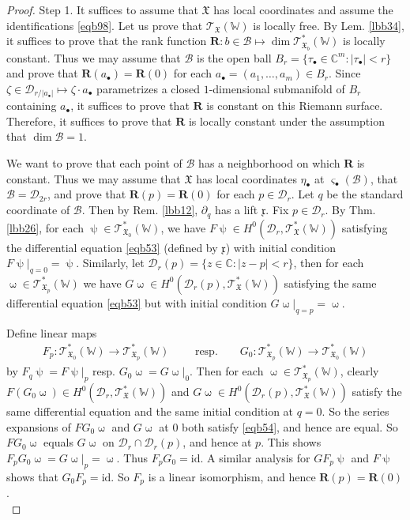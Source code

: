\documentclass[11pt,b5paper,notitlepage]{article}
\theoremstyle{definition}
\theoremstyle{plain}
\newcommand{\mc}{\mathcal}
\newcommand{\Rbf}{\mathbf{R}}
\newcommand{\scr}{\mathscr}
\newcommand{\xk}{\mathfrak x}
\newcommand{\sgm}{\varsigma}
\newcommand{\blt}{\bullet}
\newcommand{\Wbb}{\mathbb W}
\newcommand{\Cbb}{\mathbb C}
\newcommand{\<}{\left\langle}
\renewcommand{\>}{\right\rangle}
\newcommand{\MB}{\mathcal{B}}
\newcommand{\fx}{\mathfrak{X}}
\newcommand{\ST}{\mathscr{T}}
\newcommand{\MD}{\mathcal{D}}
\newcommand{\id}{\mathrm{id}}
\numberwithin{equation}{section}
\begin{document}
\begin{proof}
Step 1. It suffices to assume that $\fx$ has local coordinates and assume the identifications \eqref{eqb98}. Let us prove that $\ST_\fx(\Wbb)$ is locally free. By Lem. \ref{lbb34}, it suffices to prove that the rank function $\Rbf:b\in\MB\mapsto\dim\scr T_{\fx_b}^*(\Wbb)$ is locally constant. Thus we may assume that $\MB$ is the open ball $B_r=\{\tau_\blt\in\Cbb^m:|\tau_\blt|<r\}$ and prove that $\Rbf(a_\blt)=\Rbf(0)$ for each $a_\blt=(a_1,\dots,a_m)\in B_r$. Since $\zeta\in\mc D_{r/|a_\blt|}\mapsto \zeta\cdot a_\blt$ parametrizes a closed $1$-dimensional submanifold of $B_r$ containing $a_\blt$, it suffices to prove that $\Rbf$ is constant on this Riemann surface. Therefore, it suffices to prove that $\Rbf$ is locally constant under the assumption that $\dim\MB=1$.

We want to prove that each point of $\MB$ has a neighborhood on which $\Rbf$ is constant. Thus we may assume that $\fx$ has local coordinates $\eta_\blt$ at $\sgm_\blt(\MB)$, that $\MB=\mc D_{2r}$, and prove that $\Rbf(p)=\Rbf(0)$ for each $p\in\MD_r$. Let $q$ be the standard coordinate of $\MB$. Then by Rem. \ref{lbb12}, $\partial_q$ has a lift $\xk$.  Fix $p\in\MD_r$. By Thm. \ref{lbb26}, for each $\uppsi\in \scr T_{\fx_0}^*(\Wbb)$, we have $F\uppsi\in H^0(\mc D_r,\scr T_\fx^*(\Wbb))$ satisfying the differential equation \eqref{eqb53} (defined by $\xk$) with initial condition $F\uppsi|_{q=0}=\uppsi$. Similarly, let $\mc D_r(p)=\{z\in\Cbb:|z-p|<r\}$, then for each $\upomega\in\scr T_{\fx_p}^*(\Wbb)$ we have $G\upomega\in H^0(\mc D_r(p),\scr T_\fx^*(\Wbb))$ satisfying the same differential equation \eqref{eqb53} but with initial condition $G\upomega|_{q=p}=\upomega$. 

Define linear maps
\begin{align*}
F_p:\scr T_{\fx_0}^*(\Wbb)\rightarrow\scr T_{\fx_p}^*(\Wbb)\qquad\text{ resp.}\qquad G_0:\scr T_{\fx_p}^*(\Wbb)\rightarrow\scr T_{\fx_0}^*(\Wbb)
\end{align*}
by $F_q\uppsi=F\uppsi|_p$ resp. $G_0\upomega=G\upomega|_0$. Then for each $\upomega\in\scr T_{\fx_p}^*(\Wbb)$, clearly $F(G_0\upomega)\in H^0(\mc D_r,\scr T_\fx^*(\Wbb))$ and $G\upomega\in H^0(\mc D_r(p),\scr T_\fx^*(\Wbb))$ satisfy the same differential equation and the same initial condition at $q=0$. So the series expansions of $FG_0\upomega$ and $G\upomega$ at $0$ both satisfy \eqref{eqb54}, and hence are equal. So $FG_0\upomega$ equals $G\upomega$ on $\mc D_r\cap\mc D_r(p)$, and hence at $p$. This shows $F_pG_0\upomega=G\upomega|_p=\upomega$. Thus $F_pG_0=\id$. A similar analysis for $GF_p\uppsi$ and $F\uppsi$ shows that $G_0F_p=\id$. So $F_p$ is a linear isomorphism, and hence $\Rbf(p)=\Rbf(0)$. \\[-1ex]


\end{proof}
\end{document}
